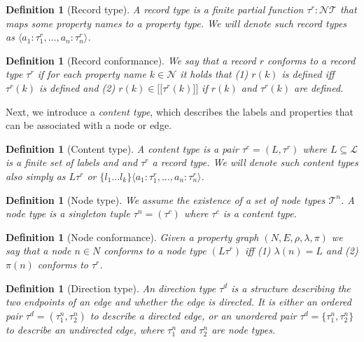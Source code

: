\documentclass[a4paper]{article}
\makeatletter
\newtheorem{definition}[theorem]{Definition}
\newcommand{\rtype}{\tau^r}
\newcommand{\ctype}{\tau^c}
\newcommand{\ntype}{\tau^n}
\newcommand{\dtype}{\tau^d}
\newcommand{\lsem}{\ensuremath{[\![}}
\newcommand{\rsem}{\ensuremath{]\!]}}
\newcommand{\sem}[1]{\ensuremath{\lsem #1 \rsem}}
\newcommand{\pto}{}%
\DeclareRobustCommand{\pto}{\mathrel{\mathpalette\p@to@gets\to}}
\newcommand{\p@to@gets}[2]{%
  \ooalign{\hidewidth$\m@th#1\mapstochar\mkern5mu$\hidewidth\cr$\m@th#1\to$\cr}%
}
\makeatother
\begin{document}
\begin{definition}[Record type]
  A \emph{record type} is a finite partial function $\rtype : \mathcal{N} \pto \mathcal{T}$ that maps some property names to a property type. We will denote such record types as $\langle a_1 : \rtype_1, \ldots, a_n : \rtype_n \rangle$.
\end{definition}

\begin{definition}[Record conformance]
  We say that a record $r$ \emph{conforms} to a record type $\rtype$ if for each property name $k \in \mathcal{N}$ it holds that (1) $r(k)$ is defined iff $\rtype(k)$ is defined and (2) $r(k) \in \sem{\rtype(k)}$ if $r(k)$ and $\rtype(k)$ are defined.
\end{definition}

Next, we introduce a \emph{content type}, which describes the labels and properties that can be associated with a node or edge.

\begin{definition}[Content type]
  A \emph{content type} is a pair $\ctype = (L, \rtype)$ where $L \subseteq \mathcal{L}$ is a finite set of labels and and $\rtype$ a record type. We will denote such content types also simply as $L \rtype$ or $\{ l_1 \ldots l_k \} \langle a_1 : \rtype_1, \ldots, a_n : \rtype_n \rangle$.
\end{definition}

\begin{definition}[Node type]
  We assume the existence of a set of \emph{node types} $\mathcal{T}^n$. A node type is a singleton tuple $\ntype = (\ctype)$ where $\ctype$ is a content type.
\end{definition}

\begin{definition}[Node conformance]
  Given a property graph $(N, E, \rho, \lambda, \pi)$ we say that a node $n \in N$ \emph{conforms} to a node type $(L\rtype)$ iff (1) $\lambda(n) = L$ and (2) $\pi(n)$ conforms to $\rtype$.
\end{definition}

\begin{definition}[Direction type]
  An \emph{direction type} $\dtype$ is a structure describing the two endpoints of an edge and whether the edge is directed. It is either an ordered pair $\dtype = (\ntype_1, \ntype_2)$ to describe a directed edge, or an unordered pair $\dtype = \{\ntype_1, \ntype_2\}$ to describe an undirected edge, where $\ntype_1$ and $\ntype_2$ are node types.
\end{definition}
\end{document}
